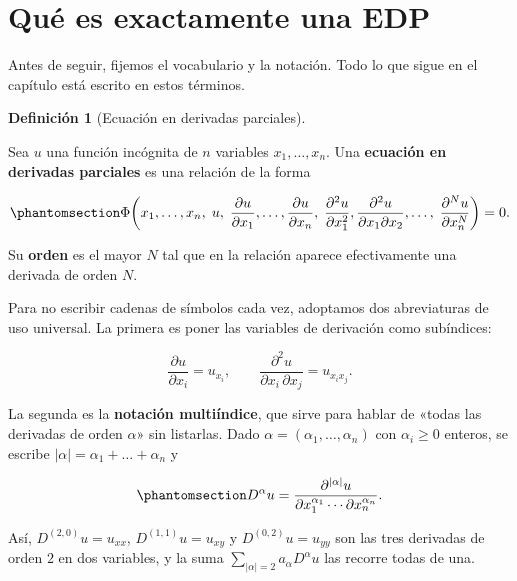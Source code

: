 \documentclass[
  spanish,
  a4paper,
]{scrbook}
\theoremstyle{definition}
\newtheorem{definition}{Definición}[chapter]
\theoremstyle{plain}
\theoremstyle{definition}
\theoremstyle{plain}
\theoremstyle{definition}
\theoremstyle{remark}
\begin{document}
\section{Qué es exactamente una EDP}\label{sec-vocabulario}

Antes de seguir, fijemos el vocabulario y la notación. Todo lo que sigue
en el capítulo está escrito en estos términos.

\begin{definition}[Ecuación en derivadas
parciales]\protect\hypertarget{def-edp}{}\label{def-edp}

Sea \(u\) una función incógnita de \(n\) variables \(x_1,\dots,x_n\).
Una \textbf{ecuación en derivadas parciales} es una relación de la forma

\begin{equation}\protect\phantomsection\label{eq-general-edp}{
\Phi\!\left(x_1,\dots,x_n,\;u,\;\frac{\partial u}{\partial x_1},\dots,\frac{\partial u}{\partial x_n},\;
\frac{\partial^2 u}{\partial x_1^2},\frac{\partial^2 u}{\partial x_1\partial x_2},\dots,\;
\frac{\partial^N u}{\partial x_n^N}\right) = 0 .
}\end{equation}

Su \textbf{orden} es el mayor \(N\) tal que en la relación aparece
efectivamente una derivada de orden \(N\).

\end{definition}

Para no escribir cadenas de símbolos cada vez, adoptamos dos
abreviaturas de uso universal. La primera es poner las variables de
derivación como subíndices:

\[
\frac{\partial u}{\partial x_i} = u_{x_i}, \qquad
\frac{\partial^2 u}{\partial x_i\,\partial x_j} = u_{x_i x_j} .
\]

La segunda es la \textbf{notación multiíndice}, que sirve para hablar de
«todas las derivadas de orden \(\alpha\)» sin listarlas. Dado
\(\alpha = (\alpha_1,\dots,\alpha_n)\) con \(\alpha_i \ge 0\) enteros,
se escribe \(|\alpha| = \alpha_1 + \dots + \alpha_n\) y

\begin{equation}\protect\phantomsection\label{eq-multiindice}{
D^{\alpha}u = \frac{\partial^{|\alpha|} u}{\partial x_1^{\alpha_1}\cdots\partial x_n^{\alpha_n}} .
}\end{equation}

Así, \(D^{(2,0)}u = u_{xx}\), \(D^{(1,1)}u = u_{xy}\) y
\(D^{(0,2)}u = u_{yy}\) son las tres derivadas de orden \(2\) en dos
variables, y la suma \(\sum_{|\alpha|=2} a_\alpha D^\alpha u\) las
recorre todas de una.
\end{document}
